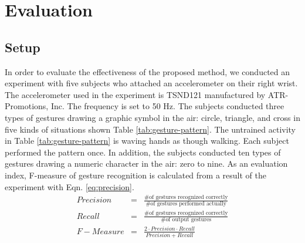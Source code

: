 \documentclass{sigchi-ext}
\begin{document}
        \section{Evaluation}
        \subsection{Setup}
        In order to evaluate the effectiveness of the proposed method, we conducted an experiment with five subjects who attached an accelerometer on their right wrist. The accelerometer used in the experiment is TSND121 manufactured by ATR-Promotions, Inc. The frequency is set to 50 Hz. The subjects conducted three types of gestures drawing a graphic symbol in the air: circle, triangle, and cross in five kinds of situations shown Table \ref{tab:gesture-pattern}. The untrained activity in Table \ref{tab:gesture-pattern} is waving hands as though walking. Each subject performed the pattern once.
        In addition, the subjects conducted ten types of gestures drawing a numeric character in the air: zero to nine. As an evaluation index, F-measure of gesture recognition is calculated from a result of the experiment with Eqn. \ref{eq:precision}.
        \begin{eqnarray}
            \label{eq:precision}
            Precision & = & \frac{\mbox{\# of gestures recognized correctly}}{\mbox{\# of gestures performed actually}} \nonumber \\
            Recall    & = & \frac{\mbox{\# of gestures recognized correctly}}{\mbox{\# of output gestures}} \nonumber \\
            F-Measure & = & \frac{2 \cdot Precision \cdot Recall}{Precision+Recall} \nonumber 
        \end{eqnarray}
        
\end{document}
